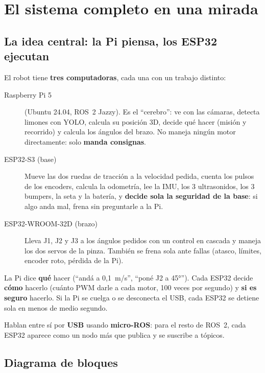 \chapter{El sistema completo en una mirada}\label{cap:general}

\section{La idea central: la Pi piensa, los ESP32 ejecutan}

El robot tiene \textbf{tres computadoras}, cada una con un trabajo distinto:

\begin{description}
  \item[Raspberry Pi 5] (Ubuntu 24.04, ROS~2 Jazzy). Es el ``cerebro'': ve con las cámaras, detecta limones con
        YOLO, calcula su posición 3D, decide qué hacer (misión y recorrido) y calcula los ángulos del brazo. No
        maneja ningún motor directamente: solo \textbf{manda consignas}.
  \item[ESP32-S3 (base)] Mueve las dos ruedas de tracción a la velocidad pedida, cuenta los pulsos de los encoders,
        calcula la odometría, lee la IMU, los 3 ultrasonidos, los 3 bumpers, la seta y la batería, y \textbf{decide
        sola la seguridad de la base}: si algo anda mal, frena sin preguntarle a la Pi.
  \item[ESP32-WROOM-32D (brazo)] Lleva J1, J2 y J3 a los ángulos pedidos con un control en cascada y maneja los dos
        servos de la pinza. También se frena sola ante fallas (atasco, límites, encoder roto, pérdida de la Pi).
\end{description}

\begin{idea}
La Pi dice \textbf{qué} hacer (``andá a 0,1~m/s'', ``poné J2 a 45°''). Cada ESP32 decide \textbf{cómo} hacerlo
(cuánto PWM darle a cada motor, 100 veces por segundo) y \textbf{si es seguro} hacerlo. Si la Pi se cuelga o se
desconecta el USB, cada ESP32 se detiene sola en menos de medio segundo.
\end{idea}

Hablan entre sí por \textbf{USB} usando \textbf{micro-ROS}: para el resto de ROS~2, cada ESP32 aparece como un nodo
más que publica y se suscribe a tópicos.

\section{Diagrama de bloques}

